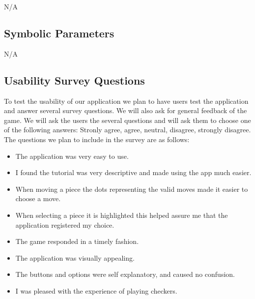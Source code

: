 \documentclass[12pt, titlepage]{article}
\begin{document}
N/A

\subsection{Symbolic Parameters}

N/A

\subsection{Usability Survey Questions}
To test the usability of our application we plan to have users test the application and answer several survey questions. We will also ask for general feedback of the game. We will ask the users the several questions and will ask them to choose one of the following answers: Stronly agree, agree, neutral, disagree, strongly disagree. The questions we plan to include in the survey are as follows:
\begin{itemize}
    \item The application was very easy to use.
    \item I found the tutorial was very descriptive and made using the app much easier.
    \item When moving a piece the dots representing the valid moves made it easier to choose a move.
    \item When selecting a piece it is highlighted this helped assure me that the application registered my choice.
    \item The game responded in a timely fashion.
    \item The application was visually appealing.
    \item The buttons and options were self explanatory, and caused no confusion.
    \item I was pleased with the experience of playing checkers.
\end{itemize}
\end{document}
